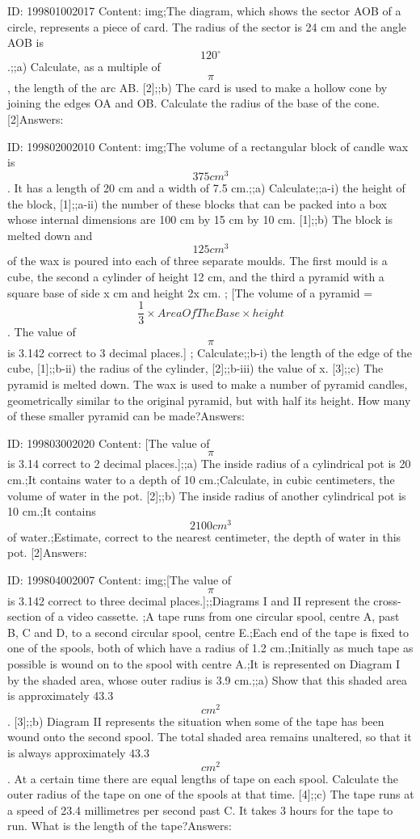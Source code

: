 \documentclass{article}
\begin{document}
ID: 199801002017
Content:
img;The diagram, which shows the sector AOB of a circle, represents a piece of card. The radius of the sector is 24 cm and the angle AOB is $$120^{\circ}$$.;;a) Calculate, as a multiple of $$\pi$$, the length of the arc AB. [2];;b) The card is used to make a hollow cone by joining the edges OA and OB. Calculate the radius of the base of the cone. [2]Answers:

ID: 199802002010
Content:
img;The volume of a rectangular block of candle wax is $$375cm^{3} $$. It has a length of 20 cm and a width of 7.5 cm.;;a) Calculate;;a-i) the height of the block, [1];;a-ii) the number of these blocks that can be packed into a box whose internal dimensions are 100 cm by 15 cm by 10 cm. [1];;b) The block is melted down and $$125cm^{3} $$ of the wax is poured into each of three separate moulds. The first mould is a cube, the second a cylinder of height 12 cm, and the third a pyramid with a square base of side x cm and height 2x cm.  ; [The volume of a pyramid = $$\frac{1}{3} \times Area Of The Base \times height$$. The value of $$\pi$$ is 3.142 correct to 3 decimal places.] ; Calculate;;b-i) the length of the edge of the cube, [1];;b-ii) the radius of the cylinder, [2];;b-iii) the value of x. [3];;c) The pyramid is melted down. The wax is used to make a number of pyramid candles, geometrically similar to the original pyramid, but with half its height. How many of these smaller pyramid can be made?Answers:

ID: 199803002020
Content:
[The value of $$\pi$$ is 3.14 correct to 2 decimal places.];;a) The inside radius of a cylindrical pot is 20 cm.;It contains water to a depth of 10 cm.;Calculate, in cubic centimeters, the volume of water in the pot. [2];;b) The inside radius of another cylindrical pot is 10 cm.;It contains $$2100 cm^3$$ of water.;Estimate, correct to the nearest centimeter, the depth of water in this pot. [2]Answers:

ID: 199804002007
Content:
img;[The value of $$\pi$$ is 3.142 correct to three decimal places.];;Diagrams I and II represent the cross-section of a video cassette. ;A tape runs from one circular spool, centre A, past B, C and D, to a second circular spool, centre E.;Each end of the tape is fixed to one of the spools, both of which have a radius of 1.2 cm.;Initially as much tape as possible is wound on to the spool with centre A.;It is represented on Diagram I by the shaded area, whose outer radius is 3.9 cm.;;a) Show that this shaded area is approximately 43.3 $$cm^2$$. [3];;b) Diagram II represents the situation when some of the tape has been wound onto the second spool. The total shaded area remains unaltered, so that it is always approximately 43.3 $$cm^2$$. At a certain time there are equal lengths of tape on each spool. Calculate the outer radius of the tape on one of the spools at that time. [4];;c) The tape runs at a speed of 23.4 millimetres per second past C. It takes 3 hours for the tape to run. What is the length of the tape?Answers:
\end{document}

